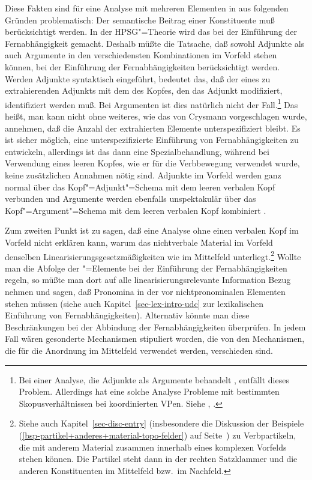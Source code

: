 Diese Fakten sind für eine Analyse mit mehreren Elementen in \slasch aus folgenden Gründen problematisch:
Der semantische Beitrag einer Konstituente muß berücksichtigt werden. In der HPSG"=Theorie
wird das bei der Einführung der Fernabhängigkeit gemacht. Deshalb müßte die Tatsache, daß
sowohl Adjunkte als auch Argumente in den verschiedensten Kombinationen im Vorfeld stehen
können, bei der Einführung der Fernabhängigkeiten berücksichtigt werden. Werden Adjunkte
syntaktisch eingeführt, bedeutet das, daß der \modw eines zu extrahierenden Adjunkts mit dem
\synsemw des Kopfes, den das Adjunkt modifiziert, identifiziert werden muß. Bei Argumenten
ist dies natürlich nicht der Fall.\footnote{
  Bei einer Analyse, die Adjunkte als Argumente behandelt \citep*{BMS2001a}, entfällt dieses Problem. Allerdings hat
  eine solche Analyse Probleme mit bestimmten Skopusverhältnissen bei koordinierten VPen.
  Siehe , .%
}
Das heißt, man kann nicht ohne weiteres, wie das von
Crysmann vorgeschlagen wurde, annehmen, daß die Anzahl der extrahierten Elemente unterspezifiziert
bleibt. Es ist sicher möglich, eine unterspezifizierte Einführung von Fernabhängigkeiten
zu entwickeln, allerdings ist das dann eine Spezialbehandlung, während bei Verwendung
eines leeren Kopfes, wie er für die Verbbewegung verwendet wurde, keine zusätzlichen Annahmen
nötig sind. Adjunkte im Vorfeld werden ganz normal über das Kopf"=Adjunkt"=Schema mit dem leeren
verbalen Kopf verbunden und Argumente werden ebenfalls unspektakulär über das Kopf"=Argument"=Schema
mit dem leeren verbalen Kopf kombiniert \citep[Abschnitt~4]{Mueller2005d}.

Zum zweiten Punkt ist zu sagen, daß eine Analyse ohne einen verbalen Kopf im Vorfeld nicht erklären
kann, warum das nichtverbale Material im Vorfeld denselben Linearisierungsgesetzmäßigkeiten 
wie im Mittelfeld unterliegt.\footnote{
  Siehe auch Kapitel~\ref{sec-disc-entry} (insbesondere die Diskussion der Beispiele (\ref{bsp-partikel+anderes+material-topo-felder})
  auf Seite~\pageref{bsp-partikel+anderes+material-topo-felder}) zu Verbpartikeln, die mit anderem Material zusammen
  innerhalb eines komplexen Vorfelds stehen können. Die Partikel steht dann in der rechten Satzklammer
  und die anderen Konstituenten im Mittelfeld bzw.\ im Nachfeld.%
} Wollte man die Abfolge der \slasch"=Elemente bei der Einführung der Fernabhängigkeiten
regeln, so müßte man dort auf alle linearisierungsrelevante Information Bezug nehmen und \zb
sagen, daß Pronomina in der \slashl vor nichtpronominalen Elementen stehen müssen (siehe auch Kapitel~\ref{sec-lex-intro-udc}
zur lexikalischen Einführung von Fernabhängigkeiten). Alternativ
könnte man diese Beschränkungen bei der Abbindung der Fernabhängigkeiten überprüfen. In jedem Fall
wären gesonderte Mechanismen stipuliert worden, die von den Mechanismen, die für die Anordnung
im Mittelfeld verwendet werden, verschieden sind.

